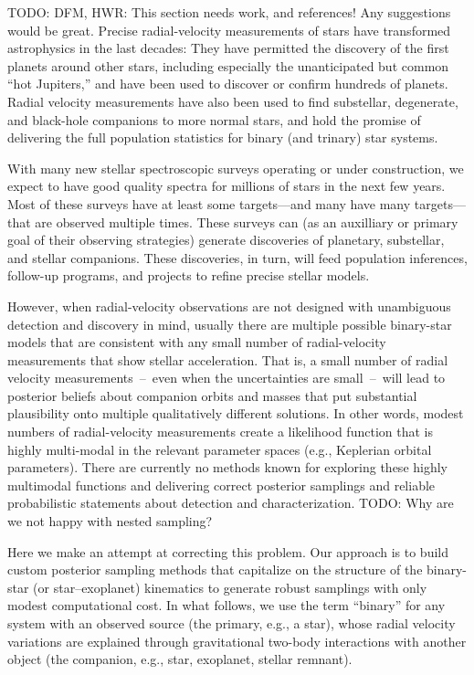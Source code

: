 \documentclass[manuscript, letterpaper]{aastex6}
\newcommand{\todo}[1]{{\color{red}TODO: #1}}
\begin{document}
\todo{DFM, HWR: This section needs work, and references! Any suggestions would
be great.}
Precise radial-velocity measurements of stars have transformed
astrophysics in the last decades:
They have permitted the discovery of the first planets around other stars,
including especially the unanticipated but common ``hot Jupiters,''
and have been used to discover or confirm hundreds
of planets.
Radial velocity measurements have also been used to find substellar,
degenerate, and black-hole companions to more normal stars, and hold
the promise of delivering the full population statistics for binary
(and trinary) star systems.

With many new stellar spectroscopic surveys operating or under
construction, we expect to have good quality spectra for millions
of stars in the next few years.
Most of these surveys have at least some targets---and many have many
targets---that are observed multiple times.
These surveys can (as an auxilliary or primary goal of their observing
strategies) generate discoveries of planetary, substellar, and stellar
companions.
These discoveries, in turn, will feed population inferences, follow-up
programs, and projects to refine precise stellar models.

However, when radial-velocity observations are not designed with
unambiguous detection and discovery in mind, usually there are
multiple possible binary-star models that are consistent with any
small number of radial-velocity measurements that show stellar
acceleration.
That is, a small number of radial velocity measurements~--~even when the
uncertainties are small~--~will lead to posterior beliefs about companion
orbits and masses that put substantial plausibility onto multiple
qualitatively different solutions.
In other words, modest numbers of radial-velocity measurements create a
likelihood function that is highly multi-modal in the relevant parameter spaces
(e.g., Keplerian orbital parameters).
There are currently no methods known for exploring these highly multimodal
functions and delivering correct posterior samplings and reliable
probabilistic statements about detection and characterization.
\todo{Why are we not happy with nested sampling?}

Here we make an attempt at correcting this problem.
Our approach is to build custom posterior sampling methods that capitalize on
the structure of the binary-star (or star--exoplanet) kinematics to generate
robust samplings with only modest computational cost.
In what follows, we use the term ``binary'' for any system with an observed
source (the primary, e.g., a star), whose radial velocity variations are
explained through gravitational two-body interactions with another object (the
companion, e.g., star, exoplanet, stellar remnant).
\end{document}
